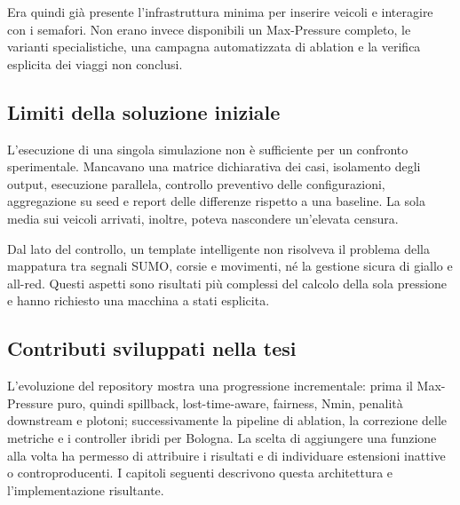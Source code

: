 \documentclass[12pt,a4paper,oneside]{report}
\numberwithin{equation}{chapter}
\begin{document}
Era quindi già presente l'infrastruttura minima per inserire veicoli e
interagire con i semafori. Non erano invece disponibili un Max-Pressure
completo, le varianti specialistiche, una campagna automatizzata di ablation e
la verifica esplicita dei viaggi non conclusi.

\subsection{Limiti della soluzione iniziale}

L'esecuzione di una singola simulazione non è sufficiente per un confronto
sperimentale. Mancavano una matrice dichiarativa dei casi, isolamento degli
output, esecuzione parallela, controllo preventivo delle configurazioni,
aggregazione su seed e report delle differenze rispetto a una baseline. La
sola media sui veicoli arrivati, inoltre, poteva nascondere un'elevata censura.

Dal lato del controllo, un template intelligente non risolveva il problema
della mappatura tra segnali SUMO, corsie e movimenti, né la gestione sicura di
giallo e all-red. Questi aspetti sono risultati più complessi del calcolo della
sola pressione e hanno richiesto una macchina a stati esplicita.

\subsection{Contributi sviluppati nella tesi}

L'evoluzione del repository mostra una progressione incrementale: prima il
Max-Pressure puro, quindi spillback, lost-time-aware, fairness, Nmin, penalità
downstream e plotoni; successivamente la pipeline di ablation, la correzione
delle metriche e i controller ibridi per Bologna. La scelta di aggiungere una
funzione alla volta ha permesso di attribuire i risultati e di individuare
estensioni inattive o controproducenti. I capitoli seguenti descrivono questa
architettura e l'implementazione risultante.
\end{document}
